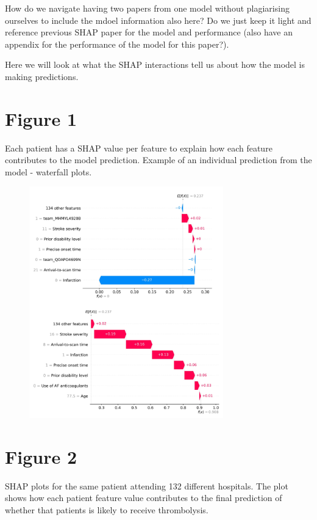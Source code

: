 How do we navigate having two papers from one model without plagiarising ourselves to include the mdoel information also here? Do we just keep it light and reference previous SHAP paper for the model and performance (also have an appendix for the performance of the model for this paper?).

Here we will look at what the SHAP interactions tell us about how the model is making predictions.

\section{Figure 1}

Each patient has a SHAP value per feature to explain how each feature contributes to the model prediction. 
Example of an individual prediction from the model - waterfall plots.

\begin{figure}[!h]
\centering
\includegraphics[width=0.75\textwidth]{./images/waterfall}
\caption{}
\label{fig:results_waterfall}
\end{figure}

\newpage
\section{Figure 2}

SHAP plots for the same patient attending 132 different hospitals. The plot shows how each patient feature value contributes to the final prediction of whether that patients is likely to receive thrombolysis.

